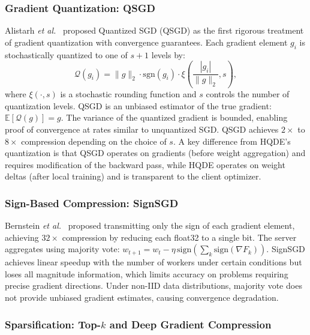 \documentclass[journal,twoside]{IEEEtran}
\newcommand{\hqde}{\mbox{HQDE}\xspace}
\newcommand{\etal}{\textit{et al.}\xspace}
\begin{document}
\subsubsection{Gradient Quantization: QSGD}

Alistarh \etal~\cite{alistarh2017} proposed Quantized SGD (QSGD) as
the first rigorous treatment of gradient quantization with convergence
guarantees. Each gradient element $g_i$ is stochastically quantized to
one of $s+1$ levels by:
\begin{equation}
  \mathcal{Q}(g_i) = \|g\|_2 \cdot \mathrm{sgn}(g_i) \cdot
  \xi\!\left(\frac{|g_i|}{\|g\|_2}, s\right),
  \label{eq:qsgd}
\end{equation}
where $\xi(\cdot, s)$ is a stochastic rounding function and $s$ controls
the number of quantization levels. QSGD is an unbiased estimator of
the true gradient: $\mathbb{E}[\mathcal{Q}(g)] = g$. The variance of
the quantized gradient is bounded, enabling proof of convergence at
rates similar to unquantized SGD. QSGD achieves $2\times$ to $8\times$
compression depending on the choice of $s$. A key difference from
\hqde{}'s quantization is that QSGD operates on gradients (before
weight aggregation) and requires modification of the backward pass,
while \hqde{} operates on weight deltas (after local training) and
is transparent to the client optimizer.

\subsubsection{Sign-Based Compression: SignSGD}

Bernstein \etal~\cite{bernstein2018} proposed transmitting only the
sign of each gradient element, achieving $32\times$ compression by
reducing each float32 to a single bit. The server aggregates using
majority vote: $w_{t+1} = w_t - \eta\,\mathrm{sign}(\sum_k
\mathrm{sign}(\nabla F_k))$. SignSGD achieves linear speedup with
the number of workers under certain conditions but loses all magnitude
information, which limits accuracy on problems requiring precise
gradient directions. Under non-IID data distributions, majority vote
does not provide unbiased gradient estimates, causing convergence
degradation.

\subsubsection{Sparsification: Top-$k$ and Deep Gradient Compression}
\end{document}
